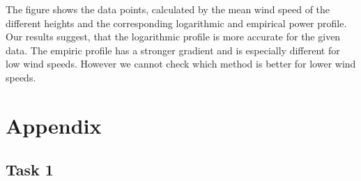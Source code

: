 \documentclass[10pt]{article}
\begin{document}
The figure shows the data points, calculated by the mean wind speed of the different heights and the corresponding logarithmic and empirical power profile.
Our results suggest, that the logarithmic profile is more accurate for the given data. The empiric profile has a stronger gradient and is especially different for low wind speeds. However we cannot check which method is better for lower wind speeds.
\newpage
\appendix
\section{Appendix}
\subsection{Task 1}
\begin{figure}[htb!]


\end{figure}
\end{document}
